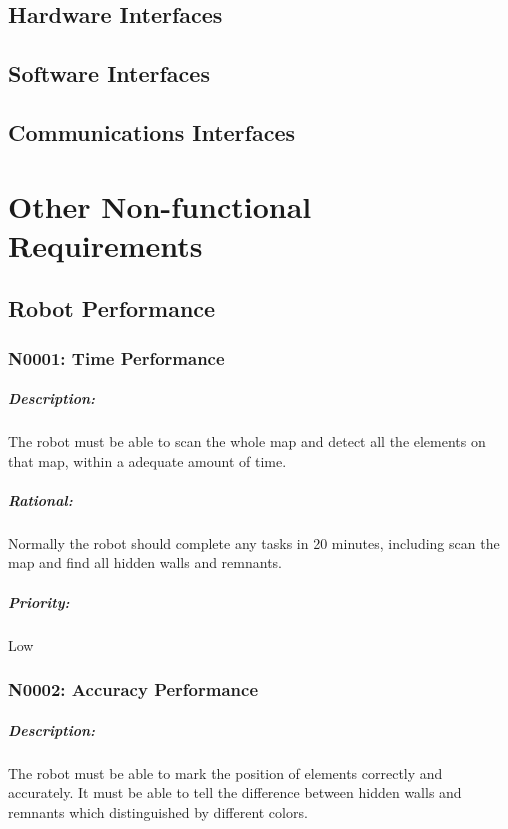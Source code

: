 \documentclass[11pt, a4paper]{report}
\begin{document}
\section{Hardware Interfaces}


\section{Software Interfaces}



\section{Communications Interfaces}

\pagebreak



\chapter{Other Non-functional Requirements}

\section{Robot Performance}

\subsection{N0001: Time Performance}
\paragraph{Description:}
The robot must be able to scan the whole map and detect all the elements on that map, within a adequate amount of time.
\paragraph{Rational:}
Normally the robot should complete any tasks in 20 minutes, including scan the map and find all hidden walls and remnants.
\paragraph{Priority:}
Low

\subsection{N0002: Accuracy Performance}
\paragraph{Description:}
The robot must be able to mark the position of elements correctly and accurately. It must be able to tell the difference between hidden walls and remnants which distinguished by different colors.
\end{document}
